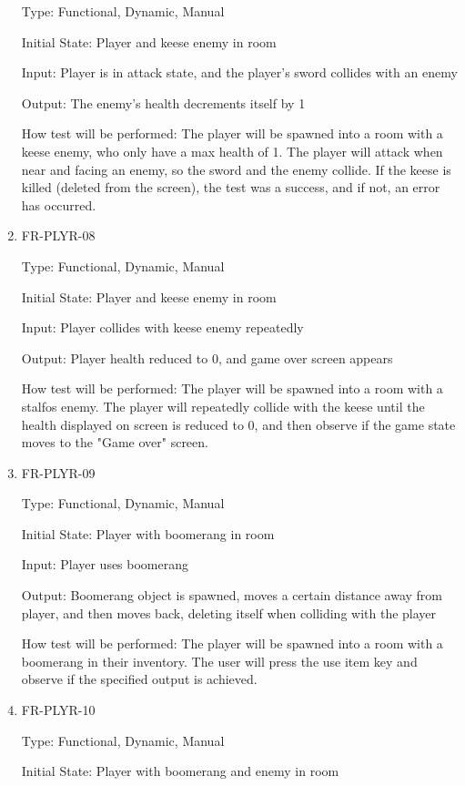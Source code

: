 \documentclass[12pt, titlepage]{article}
\begin{document}
\begin{enumerate}
Type: Functional, Dynamic, Manual

Initial State: Player and keese enemy in room

Input: Player is in attack state, and the player's sword collides with an enemy

Output: The enemy's health decrements itself by 1

How test will be performed: The player will be spawned into a room with a keese enemy, who only have a max health of 1. The player will attack when near and facing an enemy, so the sword and the enemy collide. If the keese is killed (deleted from the screen), the test was a success, and if not, an error has occurred.

\item{FR-PLYR-08\\}

Type: Functional, Dynamic, Manual

Initial State: Player and keese enemy in room

Input: Player collides with keese enemy repeatedly

Output: Player health reduced to 0, and game over screen appears

How test will be performed: The player will be spawned into a room with a stalfos enemy. The player will repeatedly collide with the keese until the health displayed on screen is reduced to 0, and then observe if the game state moves to the "Game over" screen.

\item{FR-PLYR-09\\}

Type: Functional, Dynamic, Manual

Initial State: Player with boomerang in room

Input: Player uses boomerang

Output: Boomerang object is spawned, moves a certain distance away from player, and then moves back, deleting itself when colliding with the player

How test will be performed: The player will be spawned into a room with a boomerang in their inventory. The user will press the use item key and observe if the specified output is achieved.

\item{FR-PLYR-10\\}

Type: Functional, Dynamic, Manual

Initial State: Player with boomerang and enemy in room


\end{enumerate}
\end{document}
